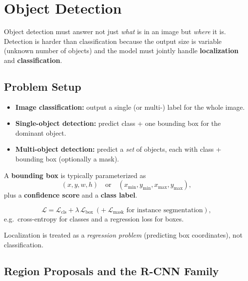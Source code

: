 \documentclass[11pt, oneside]{book}
\begin{document}
\chapter{Object Detection}

Object detection must answer not just \emph{what} is in an image but \emph{where} it is.
Detection is harder than classification because the output size is variable (unknown number of objects)
and the model must jointly handle \textbf{localization} and \textbf{classification}.

\section{Problem Setup}

\begin{itemize}
  \item \textbf{Image classification:} output a single (or multi-) label for the whole image.
  \item \textbf{Single-object detection:} predict class + one bounding box for the dominant object.
  \item \textbf{Multi-object detection:} predict a \emph{set} of objects, each with class + bounding box (optionally a mask).
\end{itemize}

\begin{defbox}[title={Bounding Box}]
A \textbf{bounding box} is typically parameterized as
\[
(x, y, w, h) \quad \text{or} \quad (x_{\min}, y_{\min}, x_{\max}, y_{\max}),
\]
plus a \textbf{confidence score} and a \textbf{class label}.
\end{defbox}

\begin{thmbox}[title={Multi-Task Detection Loss}]
\[
\mathcal{L} = \mathcal{L}_{\text{cls}} + \lambda\,\mathcal{L}_{\text{box}} \ (+\ \mathcal{L}_{\text{mask}} \text{ for instance segmentation}),
\]
e.g.\ cross-entropy for classes and a regression loss for boxes.
\end{thmbox}

Localization is treated as a \emph{regression problem} (predicting box coordinates), not classification.

\section{Region Proposals and the R-CNN Family}
\end{document}
